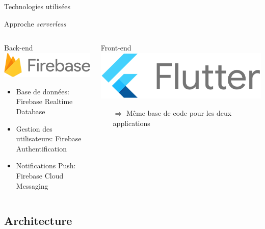 \documentclass{beamer}
\begin{document}
\begin{frame}{Technologies utilisées}

Approche \emph{serverless}

\begin{columns}

    \begin{column}[T]{.45\textwidth}

        Back-end\\
        \includegraphics[height=.5cm]{firebase.png}

        \begin{itemize}
            \item Base de données: Firebase Realtime Database
            \item Gestion des utilisateurs: Firebase Authentification
            \item Notifications Push: Firebase Cloud Messaging
        \end{itemize}

    \end{column}

    \begin{column}[T]{.45\textwidth}

        Front-end\\
        \includegraphics[height=.5cm]{flutter.png}

        \begin{itemize}
            \item[$\Rightarrow$] Même base de code pour les deux applications
        \end{itemize}

    \end{column}

\end{columns}

\end{frame}

\subsection{Architecture}
\end{document}
